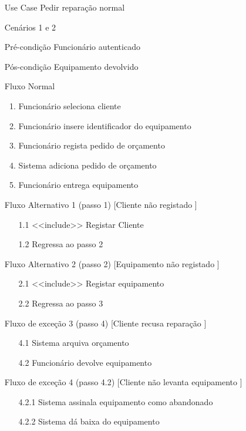 \documentclass[../relatorio.tex]{subfiles}
\begin{document}
	\begin{itemize}
		\item[Use Case] {Pedir reparação normal}
		\item[Cenários] {1 e 2} 
		\item[Pré-condição] {Funcionário autenticado} 
		\item[Pós-condição] {Equipamento devolvido}
		\item[Fluxo Normal] {
			\begin{enumerate}
				\item Funcionário seleciona cliente
				\item Funcionário insere identificador do equipamento
				\item Funcionário regista pedido de orçamento
				\item Sistema adiciona pedido de orçamento
				\item Funcionário entrega equipamento
			\end{enumerate}
		}
		\item[Fluxo Alternativo 1 (passo 1) [Cliente não registado]] {
			\begin{itemize}
				\item[1.1]{<<include>> Registar Cliente}
				\item[1.2] {Regressa ao passo 2} 
			\end{itemize}
		}
		\item[Fluxo Alternativo 2 (passo 2) [Equipamento não registado]] {
			\begin{itemize}
				\item[2.1] <<include>> Registar equipamento
				\item[2.2] Regressa ao passo 3
			\end{itemize}
		}
		\item[Fluxo de exceção 3 (passo 4) [Cliente recusa reparação]] {
			\begin{itemize}
				\item[4.1]{Sistema arquiva orçamento}
				\item[4.2]{Funcionário devolve equipamento}
			\end{itemize}
		}
		\item[Fluxo de exceção 4 (passo 4.2) [Cliente não levanta equipamento]] {
			\begin{itemize}
				\item[4.2.1]{Sistema assinala equipamento como abandonado}
				\item[4.2.2]{Sistema dá baixa do equipamento} 
			\end{itemize}
		}
	\end{itemize}
\end{document}
